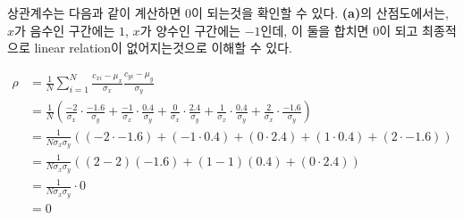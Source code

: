 \documentclass{article}
\begin{document}
상관계수는 다음과 같이 계산하면 $0$이 되는것을 확인할 수 있다.
\textbf{(a)}의 산점도에서는, $x$가 음수인 구간에는 $1$, $x$가 양수인 구간에는 $-1$인데,
이 둘을 합치면 $0$이 되고 최종적으로 linear relation이 없어지는것으로 이해할 수 있다.

\begin{align*}
	\rho &= \frac{1}{N} \sum^N_{i=1}{
		\frac{c_{xi} - \mu_x}{\sigma_x}
		\frac{c_{yi} - \mu_y}{\sigma_y}
	} \\
	&= \frac{1}{N} \left(
		\frac{-2}{\sigma_x} \cdot \frac{-1.6}{\sigma_y} +
		\frac{-1}{\sigma_x} \cdot \frac{0.4}{\sigma_y} +
		\frac{0}{\sigma_x} \cdot \frac{2.4}{\sigma_y} +
		\frac{1}{\sigma_x} \cdot \frac{0.4}{\sigma_y} +
		\frac{2}{\sigma_x} \cdot \frac{-1.6}{\sigma_y}
	\right) \\
	&= \frac{1}{N \sigma_x \sigma_y} \left(
		({-2} \cdot {-1.6}) +
		({-1} \cdot 0.4) +
		(0 \cdot 2.4) +
		(1 \cdot 0.4) +
		(2 \cdot {-1.6})
	\right) \\
	&= \frac{1}{N \sigma_x \sigma_y} \left(
		(2 - 2) ({-1.6}) +
		(1 - 1) (0.4) +
		(0 \cdot 2.4)
	\right) \\
	&= \frac{1}{N \sigma_x \sigma_y} \cdot 0 \\
	&= 0
\end{align*}
\end{document}
